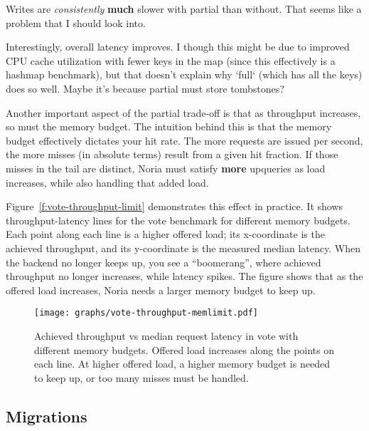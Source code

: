 \begin{inprogress}
  Writes are \textit{consistently} \textbf{much} slower with partial than
  without. That seems like a problem that I should look into.
\end{inprogress}

\begin{inprogress}
  Interestingly, overall latency improves. I though this might be due to
  improved CPU cache utilization with fewer keys in the map (since this
  effectively is a hashmap benchmark), but that doesn't explain why `full`
  (which has all the keys) does so well. Maybe it's because partial must store
  tombstones?
\end{inprogress}

Another important aspect of the partial trade-off is that as throughput
increases, so must the memory budget. The intuition behind this is that the
memory budget effectively dictates your hit rate. The more requests are issued
per second, the more misses (in absolute terms) result from a given hit
fraction. If those misses in the tail are distinct, Noria must satisfy
\textbf{more} upqueries as load increases, while also handling that added load.

Figure~\ref{f:vote-throughput-limit} demonstrates this effect in practice. It
shows throughput-latency lines for the vote benchmark for different memory
budgets. Each point along each line is a higher offered load; its x-coordinate
is the achieved throughput, and its y-coordinate is the measured median latency.
When the backend no longer keeps up, you see a ``boomerang'', where
achieved throughput no longer increases, while latency spikes. The figure
shows that as the offered load increases, Noria needs a larger memory budget to
keep up.

\begin{figure}[h]
  \centering
  \texttt{[image: graphs/vote-throughput-memlimit.pdf]}
  \caption{Achieved throughput vs median request latency in vote with different
  memory budgets. Offered load increases along the points on each line. At
  higher offered load, a higher memory budget is needed to keep up, or too many
  misses must be handled.}
  \label{f:vote-throughput-memlimit}
\end{figure}

\subsection{Migrations}
\label{s:eval:cost:mig}

